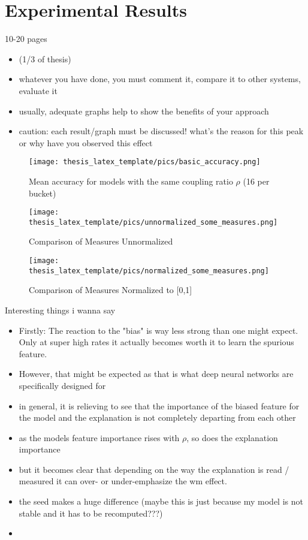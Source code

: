 \chapter{Experimental Results}\label{chapter:results}

{ \color{red}
10-20 pages 

    \begin{itemize}
        \item (1/3 of thesis)
        \item whatever you have done, you must comment it, compare it to other systems, evaluate it
        \item usually, adequate graphs help to show the benefits of your approach
        \item caution: each result/graph must be discussed! what's the reason for this peak or why have you observed this effect
    \end{itemize}
}

\begin{figure}
    \centering
    \texttt{[image: thesis\_latex\_template/pics/basic\_accuracy.png]}
    \caption{Mean accuracy for models with the same coupling ratio $\rho$ (16 per bucket)}
    \label{fig:basic_accuracy}
\end{figure}



\begin{figure}
    \centering
    \texttt{[image: thesis\_latex\_template/pics/unnormalized\_some\_measures.png]}
    \caption{Comparison of Measures Unnormalized}
    \label{fig:unnormalized}
\end{figure}


\begin{figure}
    \centering
    \texttt{[image: thesis\_latex\_template/pics/normalized\_some\_measures.png]}
    \caption{Comparison of Measures Normalized to [0,1]}
    \label{fig:normalized}
\end{figure}


Interesting things i wanna say
\begin{itemize}
    \item Firstly: The reaction to the "bias" is way less strong than one might expect. Only at super high rates it actually becomes worth it to learn the spurious feature.
    \item However, that might be expected as that is what deep neural networks are specifically designed for
    \item in general, it is relieving to see that the importance of the biased feature for the model and the explanation is not completely departing from each other
    \item as the models feature importance rises with $\rho$, so does the explanation importance
    \item but it becomes clear that depending on the way the explanation is read / measured it can over- or under-emphasize the wm effect. 
    \item the seed makes a huge difference (maybe this is just because my model is not stable and it has to be recomputed???) 
    \item 
\end{itemize}

